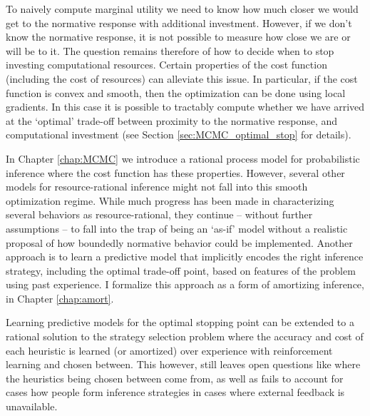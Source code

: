 To naively compute marginal utility we need to know how much closer we would get to the normative response with additional investment. However, if we don't know the normative response, it is not possible to measure how close we are or will be to it. The question remains therefore of how to decide when to stop investing computational resources. Certain properties of the cost function (including the cost of resources) can alleviate this issue. In particular, if the cost function is convex and smooth, then the optimization can be done using local gradients. In this case it is possible to tractably compute whether we have arrived at the `optimal' trade-off between proximity to the normative response, and computational investment (see Section \ref{sec:MCMC_optimal_stop} for details).


In Chapter \ref{chap:MCMC} we introduce a rational process model for probabilistic inference where the cost function has these properties. However, several other models for resource-rational inference might not fall into this smooth optimization regime. \citep{horvitz1989reflection, russell1994provably, hay2014selecting} While much progress has been made in characterizing several behaviors as resource-rational, they continue -- without further assumptions -- to fall into the trap of being an `as-if' model without a realistic proposal of how boundedly normative behavior could be implemented. Another approach is to learn a predictive model that implicitly encodes the right inference strategy, including the optimal trade-off point, based on features of the problem using past experience. I formalize this approach as a form of amortizing inference, in Chapter \ref{chap:amort}. 

Learning predictive models for the optimal stopping point can be extended to a rational solution to the strategy selection problem\citep{lieder2017strategy} where the accuracy and cost of each heuristic is learned (or amortized) over experience with reinforcement learning and chosen between. \citep{erev05, rieskamp06} This however, still leaves open questions like where the heuristics being chosen between come from, as well as fails to account for cases how people form inference strategies in cases where external feedback is unavailable.

